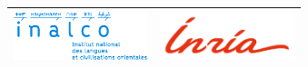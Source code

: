 
\thispagestyle{empty}

\begin{center}
  \begin{tabularx}{\textwidth}{m{10.3cm}m{4cm}}
	 \includegraphics[width = 3.9cm]{images/logos/logo-inalco.png} %
	&
	 \includegraphics[width = 3.9cm]{images/logos/logo-inria.png} %
        \\ \hline
  \end{tabularx}
\end{center}

